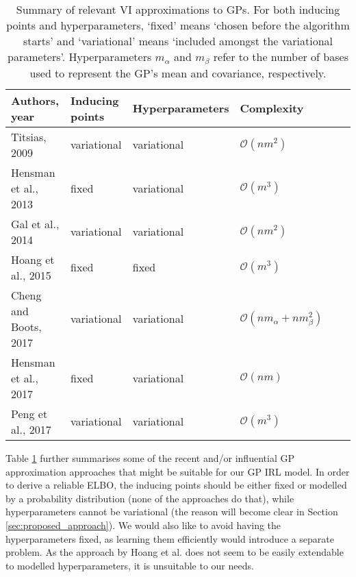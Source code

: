 \documentclass{mprop}
\theoremstyle{definition}
\begin{document}
\begin{table}
  \centering
  \begin{tabular}{llllll}
    \toprule
    Authors, year & Inducing points & Hyperparameters & Complexity \\
    \midrule
    Titsias, 2009 \cite{DBLP:journals/jmlr/Titsias09} & variational & variational & $\mathcal{O}(nm^2)$ \\
    Hensman et al., 2013 \cite{DBLP:conf/uai/HensmanFL13} & fixed & variational & $\mathcal{O}(m^3)$ \\
    Gal et al., 2014 \cite{DBLP:conf/nips/GalWR14} & variational & variational & $\mathcal{O}(nm^2)$ \\
    Hoang et al., 2015 \cite{DBLP:conf/icml/HoangHL15} & fixed & fixed & $\mathcal{O}(m^3)$ \\
    Cheng and Boots, 2017 \cite{DBLP:conf/nips/ChengB17} & variational & variational & $\mathcal{O}(nm_\alpha + nm_\beta^2)$ \\
    Hensman et al., 2017 \cite{DBLP:journals/jmlr/HensmanDS17} & fixed & variational & $\mathcal{O}(nm)$ \\
    Peng et al., 2017 \cite{DBLP:conf/icml/PengZZQ17} & variational & variational & $\mathcal{O}(m^3)$ \\
    \bottomrule
  \end{tabular}
  \caption{Summary of relevant VI approximations to GPs. For both inducing
    points and hyperparameters, `fixed' means `chosen before the algorithm
    starts' and `variational' means `included amongst the variational
    parameters'. Hyperparameters $m_\alpha$ and $m_\beta$ refer to the number of
    bases used to represent the GP's mean and covariance, respectively.}
  \label{table:approximations}
\end{table}

Table \ref{table:approximations} further summarises some of the recent and/or
influential GP approximation approaches that might be suitable for our GP IRL
model. In order to derive a reliable ELBO, the inducing points should be either
fixed or modelled by a probability distribution (none of the approaches do
that), while hyperparameters cannot be variational (the reason will become clear
in Section \ref{sec:proposed_approach}). We would also like to avoid having the
hyperparameters fixed, as learning them efficiently would introduce a separate
problem. As the approach by Hoang et al. does not seem to be easily extendable
to modelled hyperparameters, it is unsuitable to our needs.
\end{document}
